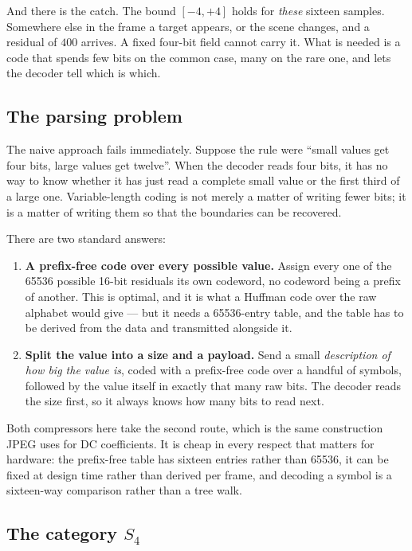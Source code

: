 And there is the catch. The bound $[-4,+4]$ holds for \emph{these} sixteen
samples. Somewhere else in the frame a target appears, or the scene changes,
and a residual of $400$ arrives. A fixed four-bit field cannot carry it. What
is needed is a code that spends few bits on the common case, many on the rare
one, and lets the decoder tell which is which.

\subsection{The parsing problem}

The naive approach fails immediately. Suppose the rule were ``small values get
four bits, large values get twelve''. When the decoder reads four bits, it has
no way to know whether it has just read a complete small value or the first
third of a large one. Variable-length coding is not merely a matter of writing
fewer bits; it is a matter of writing them so that the boundaries can be
recovered.

There are two standard answers:

\begin{enumerate}
\item \textbf{A prefix-free code over every possible value.} Assign every one
of the \num{65536} possible 16-bit residuals its own codeword, no codeword
being a prefix of another. This is optimal, and it is what a Huffman code over
the raw alphabet would give --- but it needs a \num{65536}-entry table, and the
table has to be derived from the data and transmitted alongside it.

\item \textbf{Split the value into a size and a payload.} Send a small
\emph{description of how big the value is}, coded with a prefix-free code over
a handful of symbols, followed by the value itself in exactly that many raw
bits. The decoder reads the size first, so it always knows how many bits to
read next.
\end{enumerate}

Both compressors here take the second route, which is the same construction
JPEG uses for DC coefficients. It is cheap in every respect that matters for
hardware: the prefix-free table has sixteen entries rather than \num{65536}, it
can be fixed at design time rather than derived per frame, and decoding a
symbol is a sixteen-way comparison rather than a tree walk.

\subsection{The category $S_4$}

